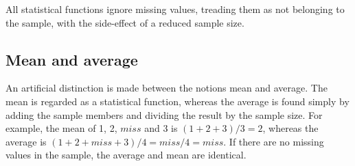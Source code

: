 All statistical functions ignore missing values, treading them as not belonging
to the sample, with the side-effect of a reduced sample size.

\subsection{Mean and average}

An artificial distinction is made between the notions mean and average.
The mean is regarded as a statistical function, whereas the average is found simply
by adding the sample members and dividing the result by the sample size.
For example, the mean of 1, 2, $miss$ and 3 is $(1+2+3)/3=2$,
whereas the average is $(1+2+miss+3)/4=miss/4=miss$.
If there are no missing values in the sample, the average and mean are identical.
